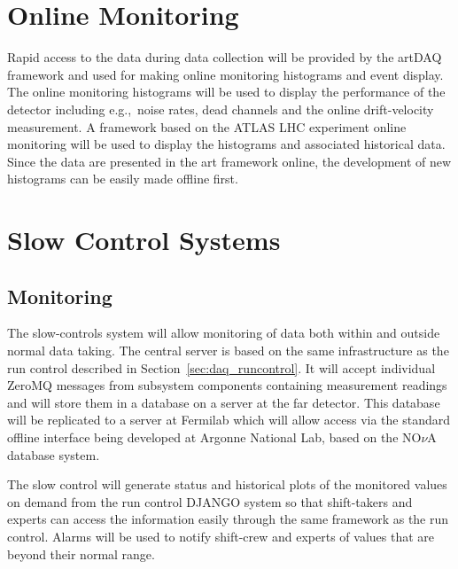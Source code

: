 \section{Online Monitoring}
\label{sec:daq_om}

Rapid access to the data during data collection will be provided by
the artDAQ framework and used for making online monitoring histograms
and event display.  The online monitoring histograms will be used to
display the performance of the detector including e.g.,\ noise rates,
dead channels and the online drift-velocity measurement.  A framework
based on the ATLAS LHC experiment online monitoring will be used to
display the histograms and associated historical data.  Since the
data are presented in the art framework online, the development of new
histograms can be easily made offline first.

\section{Slow Control Systems }
\label{sec:daq_slowcontrol}

\subsection{Monitoring}

The slow-controls system will allow monitoring of data both within and
outside normal data taking.  The central server is based on the
same infrastructure as the run control described in
Section~\ref{sec:daq_runcontrol}.  It will accept individual ZeroMQ
messages from subsystem components containing measurement readings
and will store them in a database on a server at the far detector.
This database will be replicated to a server at Fermilab which will
allow access via the standard offline interface being developed at
Argonne National Lab, based on the NO$\nu$A database system.

The slow control will generate status and historical plots of the
monitored values on demand from the run control DJANGO system so that
shift-takers and experts can access the information easily through
the same framework as the run control.  Alarms will be used to
notify shift-crew and experts of values that are beyond
their normal range.

